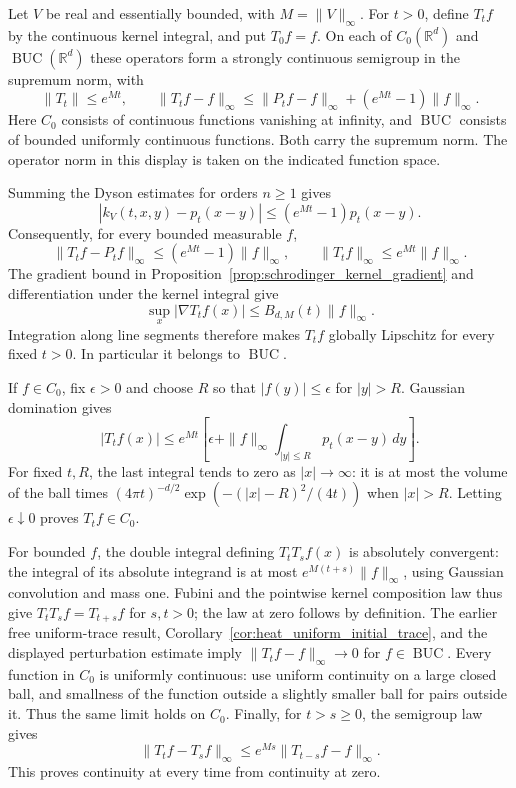 \begin{proposition}
\label{prop:schrodinger_continuous_function_semigroups}
Let $V$ be real and essentially bounded, with $M=\|V\|_\infty$.
For $t>0$, define $T_tf$ by the continuous kernel integral, and put
$T_0f=f$. On each of $C_0(\mathbb R^d)$ and
$\operatorname{BUC}(\mathbb R^d)$ these operators form a strongly
continuous semigroup in the supremum norm, with
\[
\|T_t\|\leq e^{Mt},\qquad
\|T_tf-f\|_\infty
\leq\|P_tf-f\|_\infty+(e^{Mt}-1)\|f\|_\infty.
\]
Here $C_0$ consists of continuous functions vanishing at infinity,
and $\operatorname{BUC}$ consists of bounded uniformly continuous
functions. Both carry the supremum norm.
The operator norm in this display is taken on the indicated function space.
\end{proposition}
\Proof
Summing the Dyson estimates for orders $n\geq1$ gives
\[
|k_V(t,x,y)-p_t(x-y)|\leq(e^{Mt}-1)p_t(x-y).
\]
Consequently, for every bounded measurable $f$,
\[
\|T_tf-P_tf\|_\infty\leq(e^{Mt}-1)\|f\|_\infty,
\qquad \|T_tf\|_\infty\leq e^{Mt}\|f\|_\infty.
\]
The gradient bound in Proposition~\ref{prop:schrodinger_kernel_gradient}
and differentiation under the kernel integral give
\[
\sup_x|\nabla T_tf(x)|\leq B_{d,M}(t)\|f\|_\infty.
\]
Integration along line segments therefore makes $T_tf$ globally
Lipschitz for every fixed $t>0$. In particular it belongs to
$\operatorname{BUC}$.

If $f\in C_0$, fix $\epsilon>0$ and choose $R$ so that
$|f(y)|\leq\epsilon$ for $|y|>R$. Gaussian domination gives
\[
|T_tf(x)|\leq e^{Mt}\left[
\epsilon+\|f\|_\infty\int_{|y|\leq R}p_t(x-y)\,dy\right].
\]
For fixed $t,R$, the last integral tends to zero as $|x|\to\infty$:
it is at most the volume of the ball times
$(4\pi t)^{-d/2}\exp(-(|x|-R)^2/(4t))$ when $|x|>R$.
Letting $\epsilon\downarrow0$ proves $T_tf\in C_0$.

For bounded $f$, the double integral defining $T_tT_sf(x)$ is
absolutely convergent: the integral of its absolute integrand is at
most $e^{M(t+s)}\|f\|_\infty$, using Gaussian convolution and mass one.
Fubini and the pointwise kernel composition law thus give
$T_tT_sf=T_{t+s}f$ for $s,t>0$; the law at zero follows by definition.
The earlier free uniform-trace result,
Corollary~\ref{cor:heat_uniform_initial_trace}, and the displayed
perturbation estimate imply $\|T_tf-f\|_\infty\to0$ for
$f\in\operatorname{BUC}$. Every function in $C_0$ is uniformly
continuous: use uniform continuity on a large closed ball, and smallness
of the function outside a slightly smaller ball for pairs outside it.
Thus the same limit holds on $C_0$.
Finally, for $t>s\geq0$, the semigroup law gives
\[
\|T_tf-T_sf\|_\infty
\leq e^{Ms}\|T_{t-s}f-f\|_\infty.
\]
This proves continuity at every time from continuity at zero.
\Done

